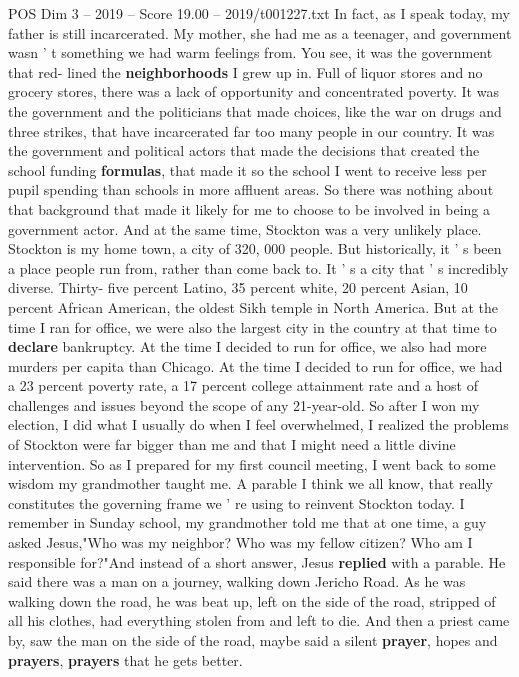 \begin{textsample}{POS Dim 3 – 2019 – Score 19.00 – 2019/t001227.txt}
In fact, as I speak today, my father is still incarcerated.
My mother, she had me as a teenager, and government wasn ' t something we had warm feelings from.
You see, it was the government that red- lined the \textbf{neighborhoods} I grew up in.
Full of liquor stores and no grocery stores, there was a lack of opportunity and concentrated poverty.
It was the government and the politicians that made choices, like the war on drugs and three strikes, that have incarcerated far too many people in our country.
It was the government and political actors that made the decisions that created the school funding \textbf{formulas}, that made it so the school I went to receive less per pupil spending than schools in more affluent areas.
So there was nothing about that background that made it likely for me to choose to be involved in being a government actor.
And at the same time, Stockton was a very unlikely place.
Stockton is my home town, a city of 320, 000 people.
But historically, it ' s been a place people run from, rather than come back to.
It ' s a city that ' s incredibly diverse.
Thirty- five percent Latino, 35 percent white, 20 percent Asian, 10 percent African American, the oldest Sikh temple in North America.
But at the time I ran for office, we were also the largest city in the country at that time to \textbf{declare} bankruptcy.
At the time I decided to run for office, we also had more murders per capita than Chicago.
At the time I decided to run for office, we had a 23 percent poverty rate, a 17 percent college attainment rate and a host of challenges and issues beyond the scope of any 21-year-old.
So after I won my election, I did what I usually do when I feel overwhelmed, I realized the problems of Stockton were far bigger than me and that I might need a little divine intervention.
So as I prepared for my first council meeting, I went back to some wisdom my grandmother taught me.
A parable I think we all know, that really constitutes the governing frame we ' re using to reinvent Stockton today.
I remember in Sunday school, my grandmother told me that at one time, a guy asked Jesus,"Who was my neighbor?
Who was my fellow citizen?
Who am I responsible for?"And instead of a short answer, Jesus \textbf{replied} with a parable.
He said there was a man on a journey, walking down Jericho Road.
As he was walking down the road, he was beat up, left on the side of the road, stripped of all his clothes, had everything stolen from and left to die.
And then a priest came by, saw the man on the side of the road, maybe said a silent \textbf{prayer}, hopes and \textbf{prayers}, \textbf{prayers} that he gets better.

\end{textsample}
